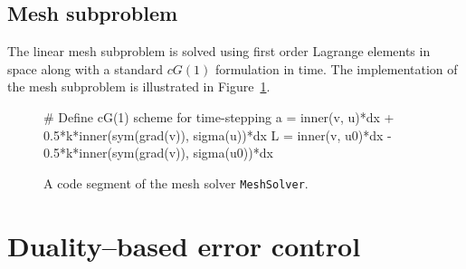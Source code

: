 \subsection{Mesh subproblem}
The linear mesh subproblem is solved using first order Lagrange
elements in space along with a standard $cG(1)$ formulation in time.
The implementation of the mesh subproblem is illustrated in
Figure~\ref{selim:fig:meshsolver}.
\begin{figure}
\caption{A code segment of the mesh solver \texttt{MeshSolver}.}
\label{selim:fig:meshsolver}
\begin{python}
  # Define cG(1) scheme for time-stepping
  a = inner(v, u)*dx + 0.5*k*inner(sym(grad(v)), sigma(u))*dx
  L = inner(v, u0)*dx - 0.5*k*inner(sym(grad(v)), sigma(u0))*dx
\end{python}
\end{figure}

\section{Duality--based error control}


